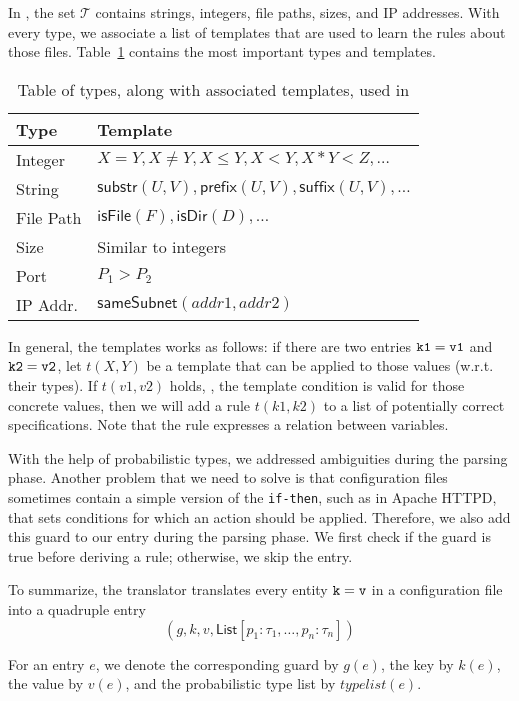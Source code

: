 In \app, the set $\mathcal{T}$ contains strings, integers, file paths, 
sizes, and IP addresses. With every type, we associate a list of templates 
that are used to learn the rules about those files. Table~\ref{table:kysymys} contains
the most important types and templates.

\begin{table}
\caption{Table of types, along with associated templates, used in \app}
  \begin{tabular}{| l |  l |}
    \hline
    Type &  Template \\ \hline
    Integer & $X = Y, X\neq Y, X \leq Y, X < Y, X * Y < Z, \ldots $\\ \hline
    String & $\textsf{substr}(U, V), \textsf{prefix}(U,V), \textsf{suffix}(U,V), \ldots$   \\ \hline
    File Path & $\textsf{isFile}(F), \textsf{isDir}(D),\ldots$   \\ \hline
    Size & Similar to integers   \\ \hline
    Port & $P_1 > P_2$ \\ \hline
    IP Addr.  & $\textsf{sameSubnet}(addr1, addr2)$   \\
    
    \hline
  \end{tabular}
\label{table:kysymys}
\end{table}


In general, the templates works as follows: if there are two entries ${\tt {k1 = v1}}$ and 
${\tt {k2 = v2}}$, let $t(X, Y)$ be a template that can be applied to those values (w.r.t. their types).
If $t(v1, v2)$ holds, \ie, the template condition is valid for those concrete values, then we will add a rule
$t(k1, k2)$ to a list of potentially correct specifications. Note that the rule expresses a relation between variables.

With the help of probabilistic types, we addressed ambiguities during the parsing phase. Another problem that we need to solve
is that configuration files sometimes contain a simple version of the {\tt {if-then}}, such as in Apache HTTPD, that 
sets conditions for which an action should be applied. Therefore, we also add this guard to our entry 
during the parsing phase. We first check if the guard is true before deriving a rule; otherwise, we skip the entry.

To summarize, the translator translates every entity ${\tt {k = v}}$ in a configuration file into a quadruple entry
$$(g,k,v,\textsf{List}[p_1:\tau_1, \ldots, p_n:\tau_n])$$

For an entry $e$, we denote the corresponding guard by $g(e)$, the key by $k(e)$, the value by $v(e)$, and the probabilistic
type list by $typelist(e)$. 


